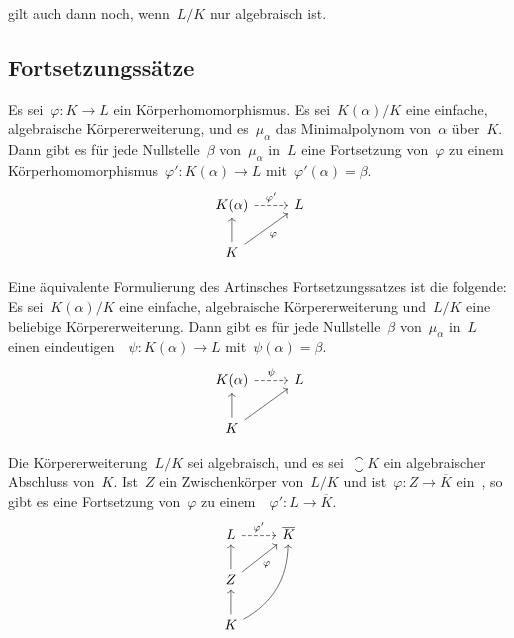 \begin{remark}
   gilt auch dann noch, wenn~$L/K$ nur algebraisch ist.
\end{remark}



\subsection{Fortsetzungssätze}

\begin{theorem}
  Es sei~$\varphi \colon K \to L$ ein Körperhomomorphismus.
  Es sei~$K(\alpha)/K$ eine einfache, algebraische Körpererweiterung, und es~$\mu_\alpha$ das Minimalpolynom von~$\alpha$ über~$K$.
  Dann gibt es für jede Nullstelle~$\beta$ von~$\mu_\alpha$ in~$L$ eine Fortsetzung von~$\varphi$ zu einem Körperhomomorphismus~$\varphi' \colon K(\alpha) \to L$ mit~$\varphi'(\alpha) = \beta$.
  \[
    \begin{tikzcd}
      K(\alpha)
      \arrow[dashed]{r}[above]{\varphi'}
      &
      L
      \\
      K
      \arrow{u}
      \arrow{ur}[below right]{\varphi}
      &
      {}
    \end{tikzcd}
  \]
\end{theorem}

\begin{remark}
  Eine äquivalente Formulierung des Artinsches Fortsetzungssatzes ist die folgende:
  Es sei~$K(\alpha)/K$ eine einfache, algebraische Körpererweiterung und~$L/K$ eine beliebige Körpererweiterung.
  Dann gibt es für jede Nullstelle~$\beta$ von~$\mu_\alpha$ in~$L$ einen eindeutigen~~$\psi \colon K(\alpha) \to L$ mit~$\psi(\alpha) = \beta$.
  \[
    \begin{tikzcd}
      K(\alpha)
      \arrow[dashed]{r}[above]{\psi}
      &
      L
      \\
      K
      \arrow{u}
      \arrow{ur}
      &
      {}
    \end{tikzcd}
  \]
\end{remark}

\begin{theorem}
  Die Körpererweiterung~$L/K$ sei algebraisch, und es sei~$\closure{K}$ ein algebraischer Abschluss von~$K$.
  Ist~$Z$ ein Zwischenkörper von~$L/K$ und ist~$\varphi \colon Z \to \overline{K}$ ein~, so gibt es eine Fortsetzung von~$\varphi$ zu einem~~$\varphi' \colon L \to \overline{K}$.
  \[
    \begin{tikzcd}
      L
      \arrow[dashed]{r}[above]{\varphi'}
      &
      \closure{K}
      \\
      Z
      \arrow{u}
      \arrow{ur}[below right]{\varphi}
      &
      {}
      \\
      K
      \arrow{u}
      \arrow[bend right]{uur}
      &
      {}
    \end{tikzcd}
  \]
\end{theorem}

